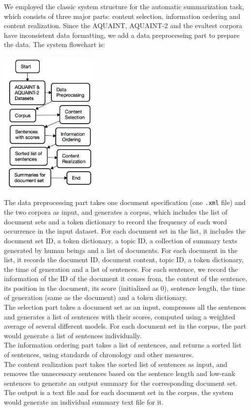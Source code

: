 \documentclass[11pt]{article}
\begin{document}
We employed the classic system structure for the automatic summarization task, which consists of three major parts: content selection, information ordering and content realization. Since the AQUAINT, AQUAINT-2 and the evaltest corpora have inconsistent data formatting, we add a data preprocessing part to prepare the data. The system flowchart is: \\
\begin{center}
\includegraphics[width=0.37\textwidth]{flowchart.png}
\end{center}
\indent
The data preprocessing part takes one document specification (one \texttt{.xml} file) and the two corpora as input, and generates a corpus, which includes the list of document sets and a token dictionary to record the frequency of each word occurrence in the input dataset. For each document set in the list, it includes the document set ID, a token dictionary, a topic ID, a collection of summary texts generated by human beings and a list of documents. For each document in the list, it records the document ID, document content, topic ID, a token dictionary, the time of generation and a list of sentences. For each sentence, we record the information of the ID of the document it comes from, the content of the sentence, its position in the document, its score (initialized as 0), sentence length, the time of generation (same as the document) and a token dictionary.\\
\indent
The selection part takes a document set as an input, compresses all the sentences and generates a list of sentences with their scores, computed using a weighted average of several different models. For each document set in the corpus, the part would generate a list of sentences individually.\\
\indent
The information ordering part takes a list of sentences, and returns a sorted list of sentences, using standards of chronology and other measures. \\
\indent
The content realization part takes the sorted list of sentences as input, and removes the unnecessary sentences based on the sentence length and low-rank sentences to generate an output summary for the corresponding document set. The output is a text file and for each document set in the corpus, the system would generate an individual summary text file for it.
\end{document}
